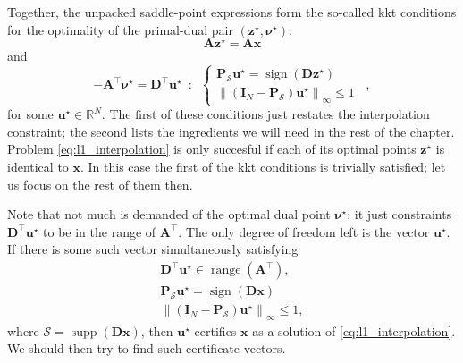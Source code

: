 Together, the unpacked saddle-point expressions form the so-called \acrfull{kkt} conditions for the optimality of the primal-dual pair $(\mathbf{z}^\star, \bm{\nu}^\star)$:
\begin{equation*}
    \mathbf{A}\mathbf{z}^{\star} = \mathbf{Ax}
\end{equation*}
and
\begin{equation*}
    -\mathbf{A}^{\top} \bm{\nu}^\star = \mathbf{D}^\top \mathbf{u}^\star \enspace : \enspace \left\{
    \begin{matrix}
        \mathbf{P}_{\mathcal{S}} \mathbf{u}^\star =  \operatorname{sign} \left ( \mathbf{D} \mathbf{z}^\star \right )\\
        \left \| \left ( \mathbf{I}_N - \mathbf{P}_\mathcal{S} \right ) \mathbf{u}^\star \right \|_{\infty} \leq 1
    \end{matrix}
    \right. \enspace ,
\end{equation*}
for some $\mathbf{u}^\star \in \mathbb{R}^{N}$. The first of these conditions just restates the interpolation constraint; the second lists the ingredients we will need in the rest of the chapter. Problem \eqref{eq:l1_interpolation} is only succesful if each of its optimal points $\mathbf{z}^\star$ is identical to $\mathbf{x}$. In this case the first of the \acrshort{kkt} conditions is trivially satisfied; let us focus on the rest of them then.

Note that not much is demanded of the optimal dual point $\bm{\nu}^\star$: it just constraints $\mathbf{D}^\top \mathbf{u}^\star$ to be in the range of $\mathbf{A}^\top$. The only degree of freedom left is the vector $\mathbf{u}^\star$. If there is some such vector simultaneously satisfying
\begin{align}
    \label{eq:kkt0}\mathbf{D}^\top \mathbf{u}^\star \in \operatorname{range} \left( \mathbf{A}^\top \right),\\
    \label{eq:kkt1}\mathbf{P}_{\mathcal{S}} \mathbf{u}^\star =  \operatorname{sign} \left ( \mathbf{Dx} \right )\\
    \label{eq:kkt2}\left \| \left ( \mathbf{I}_N - \mathbf{P}_\mathcal{S} \right ) \mathbf{u}^\star \right \|_{\infty} \leq 1,
\end{align}
where $\mathcal{S} = \operatorname{supp}\left ( \mathbf{D} \mathbf{x} \right )$, then $\mathbf{u}^\star$ certifies $\mathbf{x}$ as a solution of \eqref{eq:l1_interpolation}. We should then try to find such certificate vectors.

